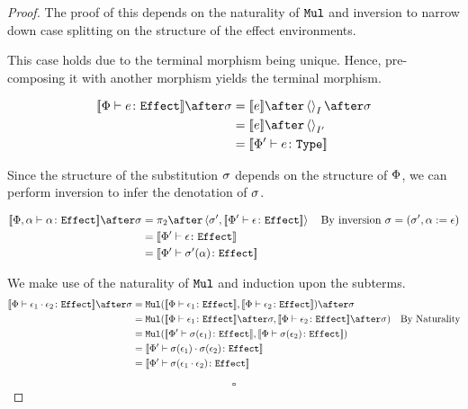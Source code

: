\documentclass{Report}
\begin{document}
\begin{proof}
    The proof of this depends on the naturality of $\Mul$ and inversion to narrow down case splitting on the structure of the effect environments.

    This case holds due to the terminal morphism being unique. Hence, pre-composing it with another morphism yields the terminal morphism.

    \begin{align}
        \deno{\typerelation{\P}{e}{\effect}}\after\si & = \deno{e}\after\term{I}\after\si \\
        & = \deno{e}\after\term{I'} \\
        & = \deno{\typerelation{\P'}{e}{\type}}\\
    \end{align}


Since the structure of the substitution $\si$ depends on the structure of $\P$, we can perform inversion to infer the denotation of $\si$.

\begin{align}
    \deno{\typerelation{\P,\a}{\a}{\effect}}\after\si &= \pp\after\pr{\si'}{\deno{\typerelation{\P'}{\e}{\effect}}}\qt{By inversion $\si = (\si', \a\setto\e)$}\\
    & =\deno{\typerelation{\P'}{\e}{\effect}} \\
    &= \deno{\typerelation{\P'}{\si'(\a)}{\effect}}\\
\end{align}



We make use of the naturality of $\Mul$ and induction upon the subterms.
\begin{align}
    \deno{\typerelation{\P}{\e_1\dot\e_2}{\effect}} \after\si &=
    \Mul(\deno{\typerelation{\P}{\e_1}{\effect}}, \deno{\typerelation{\P}{\e_2}{\effect}})\after \si \\
    & = \Mul(\deno{\typerelation{\P}{\e_1}{\effect}}\after \si, \deno{\typerelation{\P}{\e_2}{\effect}}\after \si)\qt{By Naturality}\\
    & = \Mul(\deno{\typerelation{\P'}{\si(\e_1)}{\effect}}, \deno{\typerelation{\P}{\si(\e_2)}{\effect}})\\
    & = \deno{\typerelation{\P'}{\si(\e_1)\dot\si(\e_2)}{\effect}}\\
    & = \deno{\typerelation{\P'}{\si(\e_1\dot\e_2)}{\effect}}\\
\end{align}

$$\square$$
\end{proof}
\end{document}
